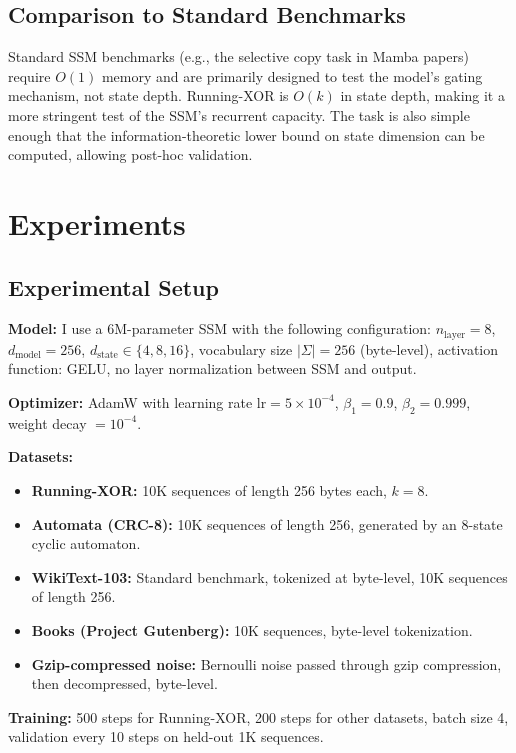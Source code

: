 \documentclass{article}
\begin{document}
\subsection{Comparison to Standard Benchmarks}

Standard SSM benchmarks (e.g., the selective copy task in Mamba papers) require $O(1)$ memory and are primarily designed to test the model's gating mechanism, not state depth. Running-XOR is $O(k)$ in state depth, making it a more stringent test of the SSM's recurrent capacity. The task is also simple enough that the information-theoretic lower bound on state dimension can be computed, allowing post-hoc validation.

\section{Experiments}

\subsection{Experimental Setup}

\textbf{Model:} I use a 6M-parameter SSM with the following configuration: $n_{\mathrm{layer}} = 8$, $d_{\mathrm{model}} = 256$, $d_{\mathrm{state}} \in \{4, 8, 16\}$, vocabulary size $|\Sigma| = 256$ (byte-level), activation function: GELU, no layer normalization between SSM and output.

\textbf{Optimizer:} AdamW with learning rate $\mathrm{lr} = 5 \times 10^{-4}$, $\beta_1 = 0.9$, $\beta_2 = 0.999$, weight decay $= 10^{-4}$.

\textbf{Datasets:}
\begin{itemize}
  \item \textbf{Running-XOR:} 10K sequences of length 256 bytes each, $k = 8$.
  \item \textbf{Automata (CRC-8):} 10K sequences of length 256, generated by an 8-state cyclic automaton.
  \item \textbf{WikiText-103:} Standard benchmark, tokenized at byte-level, 10K sequences of length 256.
  \item \textbf{Books (Project Gutenberg):} 10K sequences, byte-level tokenization.
  \item \textbf{Gzip-compressed noise:} Bernoulli noise passed through gzip compression, then decompressed, byte-level.
\end{itemize}

\textbf{Training:} 500 steps for Running-XOR, 200 steps for other datasets, batch size 4, validation every 10 steps on held-out 1K sequences.
\end{document}
